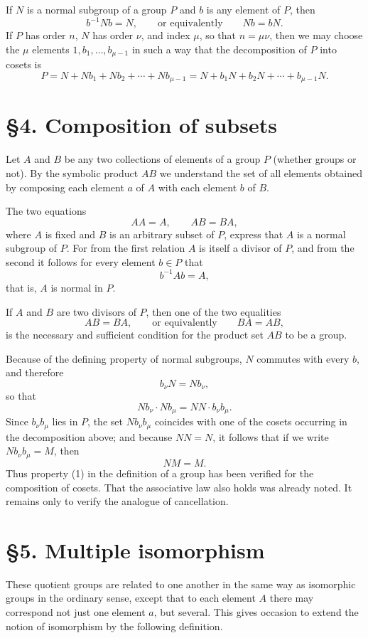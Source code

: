 \documentclass[11pt]{article}
\begin{document}
If $N$ is a normal subgroup of a group $P$ and $b$ is any element of $P$, then
\[
 b^{-1} N b = N,
 \qquad\text{or equivalently}\qquad
 N b = b N.
\]
If $P$ has order $n$, $N$ has order $\nu$, and index $\mu$, so that $n=\mu\nu$, then we may choose the $\mu$ elements $1,b_1,\dots,b_{\mu-1}$ in such a way that the decomposition of $P$ into cosets is
\[
 P = N + N b_1 + N b_2 + \cdots + N b_{\mu-1}
   = N + b_1 N + b_2 N + \cdots + b_{\mu-1} N.
\]

\section*{§4. Composition of subsets}
Let $A$ and $B$ be any two collections of elements of a group $P$ (whether groups or not). By the symbolic product $AB$ we understand the set of all elements obtained by composing each element $a$ of $A$ with each element $b$ of $B$.

The two equations
\[
 AA = A,
 \qquad
 AB = BA,
\]
where $A$ is fixed and $B$ is an arbitrary subset of $P$, express that $A$ is a normal subgroup of $P$. For from the first relation $A$ is itself a divisor of $P$, and from the second it follows for every element $b\in P$ that
\[
 b^{-1} A b = A,
\]
that is, $A$ is normal in $P$.

If $A$ and $B$ are two divisors of $P$, then one of the two equalities
\[
 AB = BA,
 \qquad\text{or equivalently}\qquad
 BA = AB,
\]
is the necessary and sufficient condition for the product set $AB$ to be a group.

Because of the defining property of normal subgroups, $N$ commutes with every $b$, and therefore
\[
 b_\nu N = N b_\nu,
\]
so that
\[
 N b_\nu \cdot N b_\mu = N N \cdot b_\nu b_\mu.
\]
Since $b_\nu b_\mu$ lies in $P$, the set $N b_\nu b_\mu$ coincides with one of the cosets occurring in the decomposition above; and because $N N = N$, it follows that if we write $N b_\nu b_\mu = M$, then
\[
 N M = M.
\]
Thus property (1) in the definition of a group has been verified for the composition of cosets. That the associative law also holds was already noted. It remains only to verify the analogue of cancellation.

\section*{§5. Multiple isomorphism}
These quotient groups are related to one another in the same way as isomorphic groups in the ordinary sense, except that to each element $A$ there may correspond not just one element $a$, but several. This gives occasion to extend the notion of isomorphism by the following definition.
\end{document}
